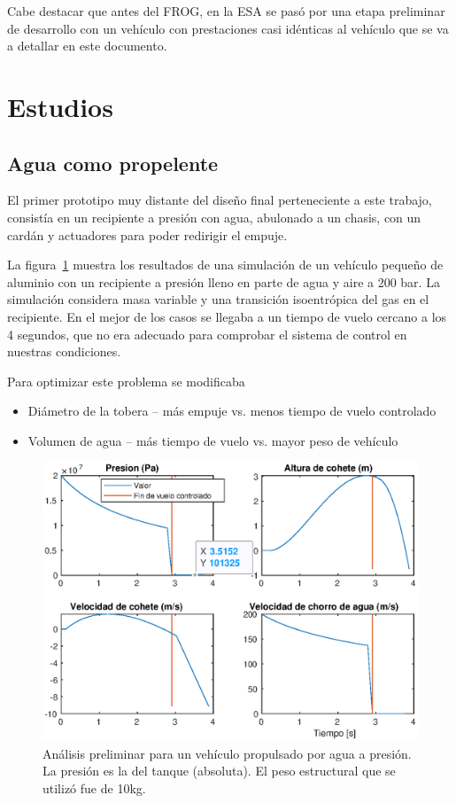 Cabe destacar que antes del FROG, en la ESA se pasó por una etapa preliminar de desarrollo con un vehículo con prestaciones casi idénticas al vehículo que se va a detallar en este documento.



\section{Estudios}

\subsection{Agua como propelente}\label{ssec:propAgua}
El primer prototipo muy distante del diseño final perteneciente a este trabajo, consistía en un
recipiente a presión con agua, abulonado a un chasis, con un cardán y actuadores para poder redirigir el
empuje. 

\medskip

La figura~\ref{fig:bottlerocket} muestra los resultados de una simulación de un vehículo pequeño de aluminio con un recipiente a presión lleno en parte de agua y aire a 200 bar. La simulación considera masa variable y una transición isoentrópica del gas en el recipiente. En el mejor de los casos se llegaba a un tiempo de vuelo cercano a los 4 segundos, que no era adecuado para comprobar el sistema de control en nuestras condiciones. 

Para optimizar este problema se modificaba

\begin{itemize}
    \item Diámetro de la tobera -- más empuje vs. menos tiempo de vuelo controlado
    \item Volumen de agua -- más tiempo de vuelo vs. mayor peso de vehículo
\end{itemize}

\begin{figure}[!ht]
    \centering
    \includegraphics[width=0.8\linewidth]{fig/bottlerocket}
    \caption{Análisis preliminar para un vehículo propulsado por agua a presión. La presión es la del tanque (absoluta). El peso estructural que se utilizó fue de 10kg.}
    \label{fig:bottlerocket}
\end{figure}

